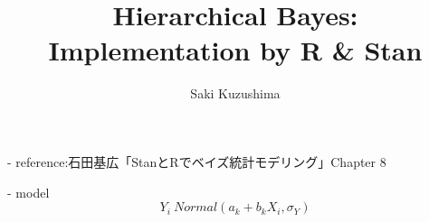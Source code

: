 \documentclass[a4paper, uplatex]{jsarticle}
\title{Hierarchical Bayes: Implementation by R \& Stan}
\author{Saki Kuzushima}
\begin{document}
\maketitle

\begin{abstract}
\end{abstract}

- reference:石田基広「StanとRでベイズ統計モデリング」Chapter 8

- model
$$
Y_i ~ Normal(a_k + b_k X_i, \sigma_Y)
$$
\end{document}

